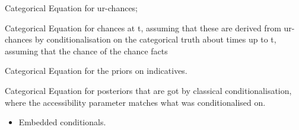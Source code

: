 \documentclass[If.tex]{subfiles}
\begin{document}
\begin{prop}
\item
  Categorical Equation for ur-chances;
\item
  Categorical Equation for chances at t, assuming that these are derived
  from ur-chances by conditionalisation on the categorical truth about
  times up to t, assuming that the chance of the chance facts
\item
  Categorical Equation for the priors on indicatives.\\
\item
  Categorical Equation for posteriors that are got by classical
  conditionalisation, where the accessibility parameter matches what was
  conditionalised on.
\end{prop}

\begin{itemize}
\item
  Embedded conditionals.\\
\end{itemize}
\end{document}
